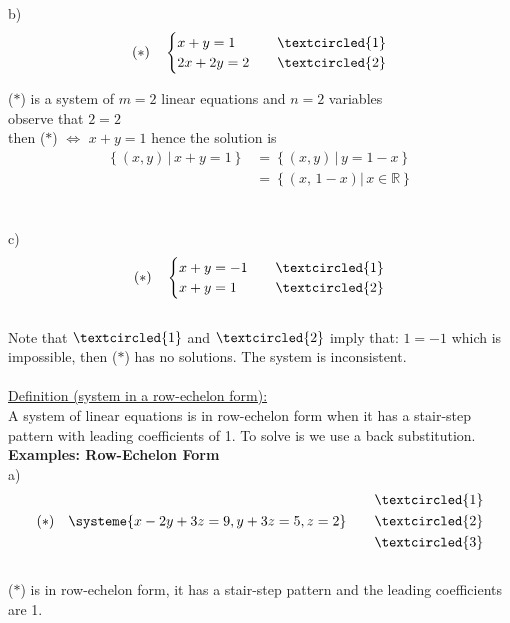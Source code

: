 \documentclass{jhwhw}
\begin{document}
b)  \begin{align*} 
    (\ast) \quad \begin{cases} 
    x+y=1 & \quad \textcircled{1} \\ 2x+2y=2 & \quad \textcircled{2}  
\end{cases}
\end{align*}

(\(\ast\)) is a system of \(m=2\) linear equations and \(n=2\) variables \\
observe that \(2=2\) \\
then (\(\ast\)) \(\Leftrightarrow\) \(x+y=1\) hence the solution is
\begin{align*} 
\left\{(x,y) \,|\, x+y=1 \right\} &= \left\{ (x,y) \, | \, y=1-x \right\} \\
&= \left\{(x, \, 1-x) | \, x \in \mathbb{R} \right\}
\end{align*}
\\ \\
c) \begin{align*} 
(\ast) \quad \begin{cases} x+y=-1 & \quad \textcircled{1} \\ x+y=1 & \quad \textcircled{2} \end{cases}
\end{align*}
\\
Note that \(\textcircled{1}\) and \(\textcircled{2}\) imply that: \(1=-1\) which is impossible, then (\(\ast\)) has no solutions. The system is inconsistent.
\\ \\

\underline{Definition (system in a row-echelon form):}
\\ 

A system of linear equations is in row-echelon form when it has a stair-step pattern with leading coefficients of 1. To solve is we use a back substitution.
\\

\textbf{Examples: Row-Echelon Form}
\\

a) \begin{align*} 
(\ast) \quad \systeme{x-2y+3z=9,y+3z=5,z=2} \quad \quad \begin{aligned} &\textcircled{1} \\ &\textcircled{2} \\ &\textcircled{3} \end{aligned}
\end{align*}
\\
(\(\ast\)) is in row-echelon form, it has a stair-step pattern and the leading coefficients are 1.
\\ \\
\end{document}
